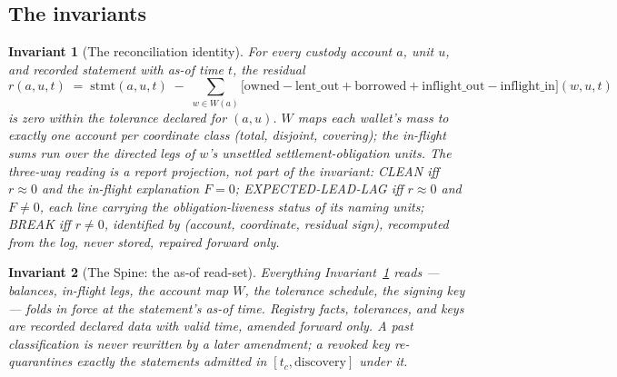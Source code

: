 \documentclass[11pt]{article}
\newtheorem{invariant}{Invariant}
\begin{document}
\subsection{The invariants}

\begin{invariant}[The reconciliation identity]\label{inv:identity}
For every custody account $a$, unit $u$, and recorded statement with as-of time
$t$, the residual
\[
r(a,u,t) \;=\; \mathrm{stmt}(a,u,t) \;-\; \sum_{w \in W(a)}
\bigl[\mathrm{owned} - \mathrm{lent\_out} + \mathrm{borrowed}
+ \mathrm{inflight\_out} - \mathrm{inflight\_in}\bigr](w,u,t)
\]
is zero within the tolerance declared for $(a, u)$. $W$ maps each wallet's mass to
exactly one account per coordinate class (total, disjoint, covering); the in-flight
sums run over the directed legs of $w$'s unsettled settlement-obligation units.
The three-way reading is a report projection, not part of the invariant:
CLEAN iff $r \approx 0$ and the in-flight explanation $F = 0$; EXPECTED-LEAD-LAG
iff $r \approx 0$ and $F \neq 0$, each line carrying the obligation-liveness status
of its naming units; BREAK iff $r \neq 0$, identified by (account, coordinate,
residual sign), recomputed from the log, never stored, repaired forward only.
\end{invariant}

\begin{invariant}[The Spine: the as-of read-set]\label{inv:spine}
Everything Invariant~\ref{inv:identity} reads --- balances, in-flight legs, the
account map $W$, the tolerance schedule, the signing key --- folds in force at the
statement's as-of time. Registry facts, tolerances, and keys are recorded declared
data with valid time, amended forward only. A past classification is never
rewritten by a later amendment; a revoked key re-quarantines exactly the statements
admitted in $[t_c, \text{discovery}]$ under it.
\end{invariant}
\end{document}
